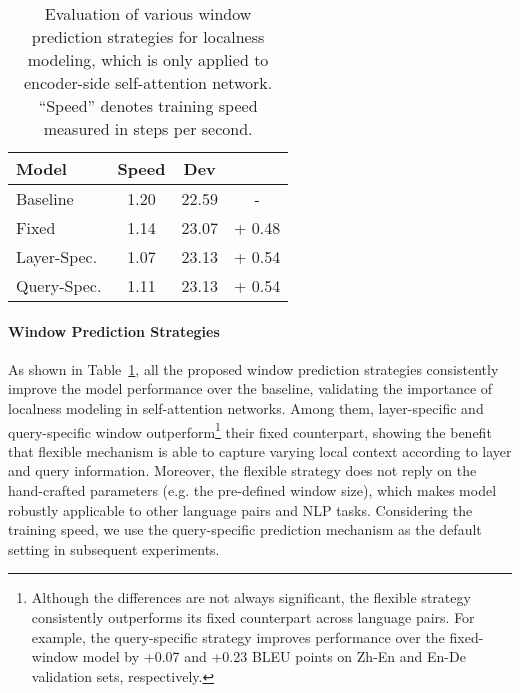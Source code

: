 \documentclass[11pt,a4paper]{article}
\begin{document}
\begin{table}[t]
\centering
\renewcommand{\arraystretch}{1.2}
\begin{tabular}{l||c|cc}
    \bf Model & \bf Speed &  \bf  Dev &  \\ 
    \hline \hline
    Baseline    &   1.20 & 22.59  & -       \\ 
    \hline
    Fixed       &   1.14 & 23.07    &   + 0.48 \\ 
    Layer-Spec. &   1.07 & 23.13    &   + 0.54 \\
    Query-Spec. &   1.11 & 23.13    &   + 0.54 \\
  \end{tabular}
  \caption{Evaluation of various window prediction strategies for localness modeling, which is only applied to encoder-side self-attention network. ``Speed'' denotes training speed measured in steps per second.}
\label{tab:scope}
\end{table}

\iffalse
\begin{figure}[h]
\begin{center}
\texttt{[image: figures/curve\_local.pdf]}
\caption{ The learning curve of each model reported in Table~\ref{tab:scope}. The BLEU scores are assessed on the development set.}
\label{fig:curve}
\end{center}
\end{figure}
\fi


\paragraph{Window Prediction Strategies}


 
As shown in Table~\ref{tab:scope}, all the proposed window prediction strategies consistently improve the model performance over the baseline, validating the importance of localness modeling in self-attention networks.
Among them, layer-specific and query-specific window outperform\footnote{{Although the differences are not always significant, the flexible strategy consistently outperforms its fixed counterpart across language pairs. For example, the query-specific strategy improves performance over the fixed-window model by +0.07 and +0.23 BLEU points on Zh-En and En-De validation sets, respectively.}} their fixed counterpart, showing the benefit that flexible mechanism is able to capture varying local context according to layer and query information.
Moreover, the flexible strategy does not reply on the hand-crafted parameters (e.g. the pre-defined window size), which makes model robustly applicable to other language pairs and NLP tasks.
Considering the training speed, we use the query-specific prediction mechanism as the default setting in subsequent experiments.
\end{document}
